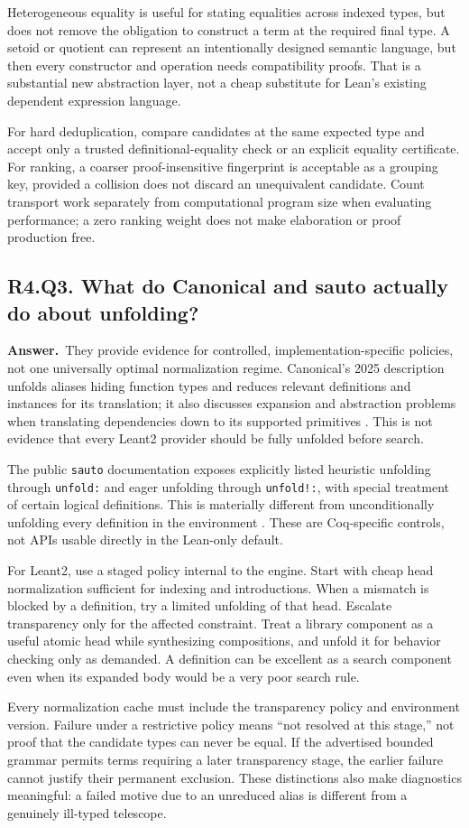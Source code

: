 \documentclass[11pt,a4paper]{article}
\theoremstyle{definition}
\theoremstyle{remark}
\newcommand{\code}[1]{\texttt{#1}}
\newcommand{\answer}{\par\noindent\textbf{Answer.}\ }
\newcommand{\qheading}[2]{\subsection{#1. #2}}
\begin{document}
Heterogeneous equality is useful for stating equalities across indexed types,
but does not remove the obligation to construct a term at the required final
type. A setoid or quotient can represent an intentionally designed semantic
language, but then every constructor and operation needs compatibility proofs.
That is a substantial new abstraction layer, not a cheap substitute for
Lean's existing dependent expression language.

For hard deduplication, compare candidates at the same expected type and
accept only a trusted definitional-equality check or an explicit equality
certificate. For ranking, a coarser proof-insensitive fingerprint is acceptable
as a grouping key, provided a collision does not discard an unequivalent
candidate. Count transport work separately from computational program size
when evaluating performance; a zero ranking weight does not make elaboration
or proof production free.

\qheading{R4.Q3}{What do Canonical and sauto actually do about unfolding?}
\answer They provide evidence for controlled, implementation-specific policies,
not one universally optimal normalization regime. Canonical's 2025 description
unfolds aliases hiding function types and reduces relevant definitions and
instances for its translation; it also discusses expansion and abstraction
problems when translating dependencies down to its supported primitives
\cite{canonical}. This is not evidence that every Leant2 provider should be
fully unfolded before search.

The public \code{sauto} documentation exposes explicitly listed heuristic
unfolding through \code{unfold:} and eager unfolding through \code{unfold!:},
with special treatment of certain logical definitions. This is materially
different from unconditionally unfolding every definition in the environment
\cite{sauto}. These are Coq-specific controls, not APIs usable directly in the
Lean-only default.

For Leant2, use a staged policy internal to the engine. Start with cheap
head normalization sufficient for indexing and introductions. When a mismatch
is blocked by a definition, try a limited unfolding of that head. Escalate
transparency only for the affected constraint. Treat a library component as a
useful atomic head while synthesizing compositions, and unfold it for behavior
checking only as demanded. A definition can be excellent as a search component
even when its expanded body would be a very poor search rule.

Every normalization cache must include the transparency policy and environment
version. Failure under a restrictive policy means ``not resolved at this
stage,'' not proof that the candidate types can never be equal. If the
advertised bounded grammar permits terms requiring a later transparency stage,
the earlier failure cannot justify their permanent exclusion. These distinctions
also make diagnostics meaningful: a failed motive due to an unreduced alias
is different from a genuinely ill-typed telescope.
\end{document}
